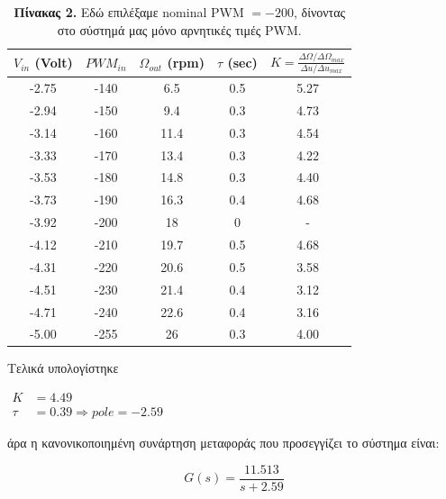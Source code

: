 \documentclass{article}
\begin{document}
    \begin{table}[!h]
        \centering
        \begin{tabular}{|c|c|c|c|c|}
        \hline
            \(V_{in}\) (Volt) & \(PWM_{in}\) & \(\Omega_{out}\) (rpm) & \(\tau\) (sec) & \(Κ = \frac{\Delta\Omega/\Delta\Omega_{max}}{\Delta u/{\Delta u}_{max}}\)\\ \hline
            -2.75 & -140 &  6.5 & 0.5 & 5.27\\ \hline
            -2.94 & -150 &  9.4 & 0.3 & 4.73\\ \hline
            -3.14 & -160 & 11.4 & 0.3 & 4.54\\ \hline
            -3.33 & -170 & 13.4 & 0.3 & 4.22\\ \hline
            -3.53 & -180 & 14.8 & 0.3 & 4.40\\ \hline
            -3.73 & -190 & 16.3 & 0.4 & 4.68\\ \hline
            -3.92 & -200 &   18 &   0 & -   \\ \hline
            -4.12 & -210 & 19.7 & 0.5 & 4.68\\ \hline
            -4.31 & -220 & 20.6 & 0.5 & 3.58\\ \hline
            -4.51 & -230 & 21.4 & 0.4 & 3.12\\ \hline
            -4.71 & -240 & 22.6 & 0.4 & 3.16\\ \hline
            -5.00 & -255 &   26 & 0.3 & 4.00\\ \hline
        \end{tabular}
        \caption{\textbf{Πίνακας 2.} Εδώ επιλέξαμε nominal PWM \(= -200\), δίνοντας στο σύστημά μας μόνο αρνητικές τιμές PWM.}
    \end{table}

    \hfill\break
    Τελικά υπολογίστηκε

    \hfill\break
    \begin{math}
        \begin{aligned}
            K &= 4.49 \\
            \tau &= 0.39 \Rightarrow pole = -2.59
        \end{aligned}
    \end{math}
    
    \hfill\break
    άρα η κανονικοποιημένη συνάρτηση μεταφοράς που προσεγγίζει το σύστημα είναι:
    
    \begin{equation*}
        \boxed{G(s) = \frac{11.513}{s + 2.59}}
    \end{equation*}
    
\end{document}
